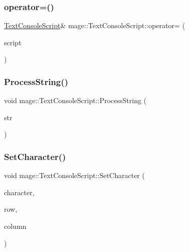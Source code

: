 \hypertarget{classmage_1_1_text_console_script_a2a14c6a981fe7ded4e7a4fa5480ac6cb}{}\label{classmage_1_1_text_console_script_a2a14c6a981fe7ded4e7a4fa5480ac6cb} 
\subsubsection{\texorpdfstring{operator=()}{operator=()}\hspace{0.1cm}{\footnotesize\ttfamily [2/2]}}
{\footnotesize\ttfamily \hyperlink{classmage_1_1_text_console_script}{Text\+Console\+Script}\& mage\+::\+Text\+Console\+Script\+::operator= (\begin{DoxyParamCaption}\item[{\hyperlink{classmage_1_1_text_console_script}{Text\+Console\+Script} \&\&}]{script }\end{DoxyParamCaption})\hspace{0.3cm}{\ttfamily [delete]}}

\hypertarget{classmage_1_1_text_console_script_ac1e1d4768ead2de82493ab487449bbd8}{}\label{classmage_1_1_text_console_script_ac1e1d4768ead2de82493ab487449bbd8} 
\subsubsection{\texorpdfstring{Process\+String()}{ProcessString()}}
{\footnotesize\ttfamily void mage\+::\+Text\+Console\+Script\+::\+Process\+String (\begin{DoxyParamCaption}\item[{const wchar\+\_\+t $\ast$}]{str }\end{DoxyParamCaption})\hspace{0.3cm}{\ttfamily [private]}}

\hypertarget{classmage_1_1_text_console_script_a08324571bfbe793eafedc22126e575b9}{}\label{classmage_1_1_text_console_script_a08324571bfbe793eafedc22126e575b9} 
\subsubsection{\texorpdfstring{Set\+Character()}{SetCharacter()}}
{\footnotesize\ttfamily void mage\+::\+Text\+Console\+Script\+::\+Set\+Character (\begin{DoxyParamCaption}\item[{wchar\+\_\+t}]{character,  }\item[{uint32\+\_\+t}]{row,  }\item[{uint32\+\_\+t}]{column }\end{DoxyParamCaption})\hspace{0.3cm}{\ttfamily [private]}}

